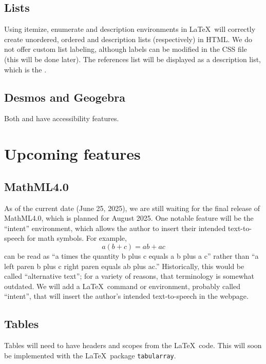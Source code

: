 \documentclass{ximera}
\begin{document}
\subsection{Lists}
Using itemize, enumerate and description environments in \LaTeX\ will correctly create unordered, ordered and description lists (respectively) in HTML. We do not offer custom list labeling, although
labels can be modified in the CSS file (this will be done later). The references list will be displayed as a description list, which is the .

\subsection{Desmos and Geogebra}
Both  and  have accessibility features.


\section{Upcoming features}

\subsection{MathML4.0}
As of the current date (June 25, 2025), we are still waiting for the final release of MathML4.0, which is planned for August 2025.
One notable feature will be the ``intent'' environment, which allows the author to insert their intended text-to-speech for
math symbols. For example, 
\[
a(b+c) = ab + ac
\]
can be read as ``a times the quantity b plus c equals a b plus a c'' rather than ``a left paren b plus c right paren equals ab plus ac.''
Historically, this would be called ``alternative text''; for a variety of reasons, that terminology is somewhat outdated. 
We will add a \LaTeX\ command or environment, probably called ``intent'', that will insert the author's intended text-to-speech in the
webpage. 

\subsection{Tables}
Tables will need to have headers and scopes from the \LaTeX\ code. This will soon be implemented with the \LaTeX\ package \verb!tabularray!. 
\end{document}
